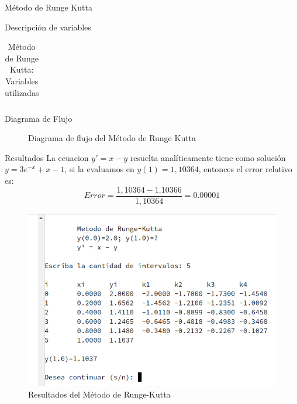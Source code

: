 \documentclass[letterpaper, 12pt]{article}
\begin{document}
\begin{section}{Método de Runge Kutta}
\begin{subsection}{Descripción de variables}
\begin{table}[h]
\begin{tabular}{|c c c|}
          \hline
        \end{tabular}
        \caption{Método de Runge Kutta: Variables utilizadas}
      \end{table}
    \end{subsection}
    \newpage
    \begin{subsection}{Diagrama de Flujo}
      \begin{figure}[h]
        \centering
        
        \caption{Diagrama de flujo del Método de Runge Kutta}
      \end{figure}
    \end{subsection}
    \newpage
    \begin{subsection}{Resultados}
      La ecuacion $y' = x -y$ resuelta analíticamente tiene como solución $y = 3e^{-x} +x -1$, si la evaluamos en $y(1)=1,10364$, entonces el error relativo es:
      \[Error = \frac{1,10364 - 1.10366}{1,10364} = 0.00001\]
      \begin{figure}[h]
        \centering
        \includegraphics[scale=1.0]{Runge.png}
        \caption{Resultados del Método de Runge-Kutta}
      \end{figure}
    \end{subsection}
  \end{section}
  \newpage
\end{document}
